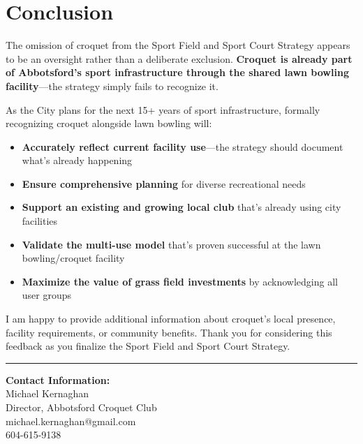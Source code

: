 \documentclass[11pt,letterpaper]{article}
\begin{document}
\section*{Conclusion}

The omission of croquet from the Sport Field and Sport Court Strategy appears to be an oversight rather than a deliberate exclusion. \textbf{Croquet is already part of Abbotsford's sport infrastructure through the shared lawn bowling facility}---the strategy simply fails to recognize it.

As the City plans for the next 15+ years of sport infrastructure, formally recognizing croquet alongside lawn bowling will:
\begin{itemize}[leftmargin=*]
    \item \textbf{Accurately reflect current facility use}---the strategy should document what's already happening
    \item \textbf{Ensure comprehensive planning} for diverse recreational needs
    \item \textbf{Support an existing and growing local club} that's already using city facilities
    \item \textbf{Validate the multi-use model} that's proven successful at the lawn bowling/croquet facility
    \item \textbf{Maximize the value of grass field investments} by acknowledging all user groups
\end{itemize}

I am happy to provide additional information about croquet's local presence, facility requirements, or community benefits. Thank you for considering this feedback as you finalize the Sport Field and Sport Court Strategy.

\vspace{0.5cm}
\noindent\rule{\textwidth}{0.4pt}
\vspace{0.5cm}

\noindent
\textbf{Contact Information:} \\
Michael Kernaghan \\
Director, Abbotsford Croquet Club \\
michael.kernaghan@gmail.com \\
604-615-9138
\end{document}

